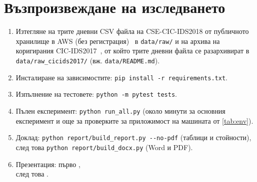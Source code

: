 \chapter{Възпроизвеждане на изследването}\label{app:repro}
\begin{enumerate}
  \item Изтегляне на трите дневни CSV файла на CSE-CIC-IDS2018 от публичното хранилище в AWS (без регистрация)~\cite{aws2018} в \texttt{data/raw/} и на архива на коригирания CIC-IDS2017~\cite{liu2022web}, от който трите дневни файла се разархивират в \texttt{data/raw\_cicids2017/} (вж. \texttt{data/README.md}).
  \item Инсталиране на зависимостите: \texttt{pip install -r requirements.txt}.
  \item Изпълнение на тестовете: \texttt{python -m pytest tests}.
  \item Пълен експеримент: \texttt{python run\_all.py} (около  минути за основния експеримент и още  за проверките за приложимост на машината от \cref{tab:env}).
  \item Доклад: \texttt{python report/build\_report.py -{}-no-pdf} (таблици и стойности), след това \texttt{python report/build\_docx.py} (Word и PDF).
  \item Презентация: първо ,\\ след това .
\end{enumerate}


